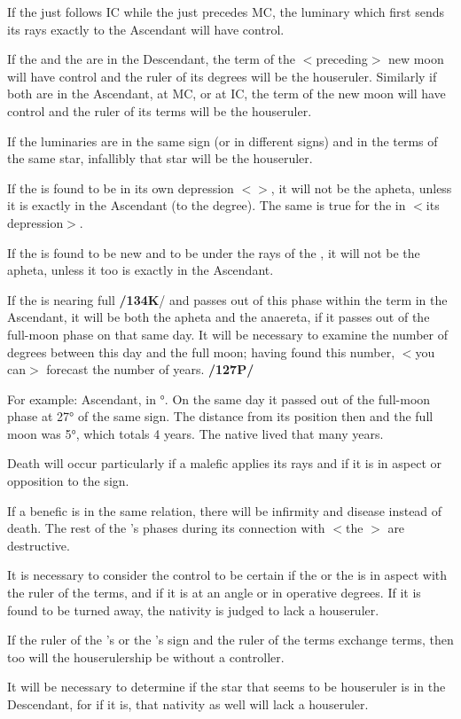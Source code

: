 If the \Sun\xspace just follows IC while the \Moon\xspace just
precedes MC, the luminary which first sends its rays exactly to the Ascendant will have control. 

If the \Sun\xspace and the \Moon\xspace are in the Descendant, the term of the $<$preceding$>$ new moon will have control and the ruler of its degrees will be the houseruler. Similarly if both are in the Ascendant, at MC, or at IC, the term of the new moon will have control and the ruler of its terms will be the houseruler. 

If the luminaries are in the same sign (or in different signs) and in the terms of the same star, infallibly that star will be the houseruler.

If the \Sun\xspace is found to be in its own depression $<$\Libra$>$, it will not be the apheta, unless it is exactly in
the Ascendant (to the degree). The same is true for the \Moon\xspace in \Scorpio\xspace $<$its depression$>$. 

If the \Moon\xspace is found to be new and to be under the rays of the \Sun, it will not be the apheta, unless it too is exactly in the Ascendant.

If the \Moon\xspace is nearing full \textbf{/134K}/ and passes out of this phase within the term in the Ascendant, it will be both the apheta and the anaereta, if it passes out of the full-moon phase on that same day. It will be necessary to examine the number of degrees between this day and the full moon; having found this number, $<$you can$>$ forecast the number of years. \textbf{/127P/}

For example: Ascendant, \Moon\xspace in °. On the same
day it passed out of the full-moon phase at 27° of the same sign. The distance from its position then and the full moon was 5°, which totals 4 years. The native lived that many years.

Death will occur particularly if a malefic applies its rays and if it is in aspect or opposition to the sign.

If a benefic is in the same relation, there will be infirmity and disease instead of death. The rest of the \Moon’s phases during its connection with $<$the \Sun$>$ are destructive.

It is necessary to consider the control to be certain if the \Sun\xspace or the \Moon\xspace is in aspect with the ruler of the terms, and if it is at an angle or in operative degrees. If it is found to be turned away, the nativity is judged to lack a houseruler. 

If the ruler of the \Sun’s or the \Moon’s sign and the ruler of the terms exchange terms, then too will the houserulership be without a controller. 

It will be necessary to determine if the star that seems to be houseruler is in the Descendant, for if it is, that nativity as well will lack a houseruler.

\newpage